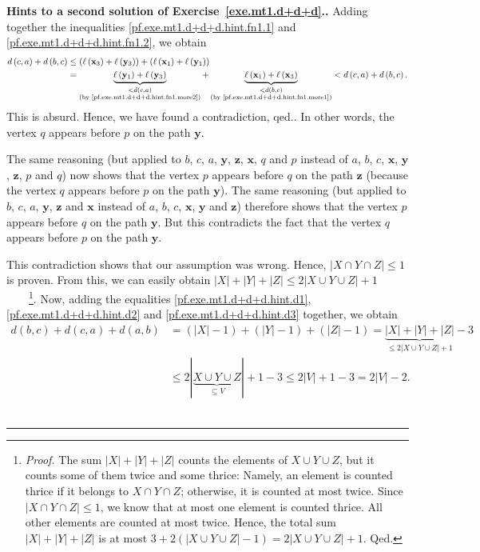 \documentclass[numbers=enddot,12pt,final,onecolumn,notitlepage]{scrartcl}%
\theoremstyle{definition}
\newenvironment{proof}[1][Proof]{\noindent\textbf{#1.} }{\ \rule{0.5em}{0.5em}}
\newcommand{\abs}[1]{\left| #1 \right|}
\newcommand{\tup}[1]{\left( #1 \right)}
\begin{document}
\begin{proof}[Hints to a second solution of Exercise~\ref{exe.mt1.d+d+d}.]
{Adding together the inequalities \eqref{pf.exe.mt1.d+d+d.hint.fn1.1}
and \eqref{pf.exe.mt1.d+d+d.hint.fn1.2}, we obtain
\begin{align*}
d \tup{c, a} + d \tup{b, c}
&\leq \tup{\ell\tup{\mathbf{x}_3} + \ell\tup{\mathbf{y}_3}}
      + \tup{\ell\tup{\mathbf{x}_1} + \ell\tup{\mathbf{y}_1}} \\
&=
  \underbrace{ \ell\tup{\mathbf{y}_1}
               + \ell\tup{\mathbf{y}_3} }
             _{\substack{< d\tup{c, a} \\
                 \text{(by \eqref{pf.exe.mt1.d+d+d.hint.fn1.more2})}}}
+ \underbrace{ \ell\tup{\mathbf{x}_1}
               + \ell\tup{\mathbf{x}_3} }
             _{\substack{< d\tup{b, c} \\
                 \text{(by \eqref{pf.exe.mt1.d+d+d.hint.fn1.more1})}}}
< d \tup{c, a} + d \tup{b, c}.
\end{align*}
This is absurd. Hence, we have found a contradiction, qed.}.
In other words, the vertex $q$ appears before $p$ on the path
$\mathbf{y}$.

The same reasoning (but applied to $b$, $c$, $a$, $\mathbf{y}$,
$\mathbf{z}$, $\mathbf{x}$, $q$ and $p$ instead of $a$, $b$, $c$,
$\mathbf{x}$, $\mathbf{y}$, $\mathbf{z}$, $p$ and $q$) now shows that
the vertex $p$ appears before $q$ on the path $\mathbf{z}$ (because
the vertex $q$ appears before $p$ on the path $\mathbf{y}$). The same
reasoning (but applied to $b$, $c$, $a$, $\mathbf{y}$,
$\mathbf{z}$ and $\mathbf{x}$ instead of $a$, $b$, $c$,
$\mathbf{x}$, $\mathbf{y}$ and $\mathbf{z}$) therefore shows
that the vertex $p$ appears before $q$ on the path $\mathbf{y}$. But
this contradicts the fact that the vertex $q$ appears before $p$ on
the path $\mathbf{y}$.

This contradiction shows that our assumption was wrong. Hence,
$\abs{X \cap Y \cap Z} \leq 1$ is proven. From this, we can easily
obtain $\abs{X} + \abs{Y} + \abs{Z} \leq 2 \abs{X \cup Y \cup Z} + 1$
\ \ \ \ \footnote{\textit{Proof.} The sum
$\abs{X} + \abs{Y} + \abs{Z}$ counts the elements of
$X \cup Y \cup Z$, but it counts some of them twice and some thrice:
Namely, an element is counted thrice if it belongs to
$X \cap Y \cap Z$; otherwise, it is counted at most twice. Since
$\abs{X \cap Y \cap Z} \leq 1$, we know that at most one element is
counted thrice. All other elements are counted at most twice. Hence,
the total sum $\abs{X} + \abs{Y} + \abs{Z}$ is at most
$3 + 2 \tup{\abs{X \cup Y \cup Z} - 1} = 2 \abs{X \cup Y \cup Z} + 1$.
Qed.}. Now, adding the equalities
\eqref{pf.exe.mt1.d+d+d.hint.d1}, \eqref{pf.exe.mt1.d+d+d.hint.d2}
and \eqref{pf.exe.mt1.d+d+d.hint.d3} together, we obtain
\begin{align*}
d \tup{b, c} + d \tup{c, a} + d \tup{a, b}
&= \tup{\abs{X} - 1} + \tup{\abs{Y} - 1} + \tup{\abs{Z} - 1}
= \underbrace{\abs{X} + \abs{Y} + \abs{Z}}
             _{\leq 2 \abs{X \cup Y \cup Z} + 1}
  - 3 \\
&\leq 2 \abs{\underbrace{X \cup Y \cup Z}_{\subseteq V}} + 1 - 3
\leq 2 \abs{V} + 1 - 3 = 2 \abs{V} - 2.
\end{align*}
\end{proof}
\end{document}

